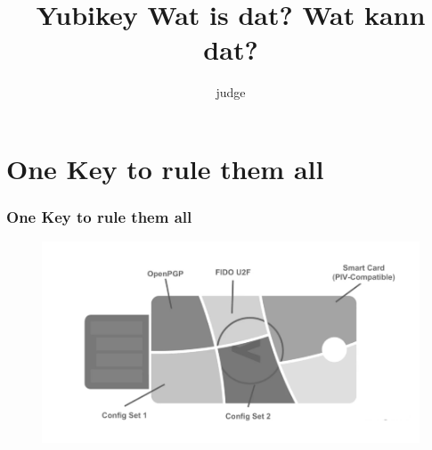\documentclass{beamer}
\title{Yubikey Wat is dat? Wat kann dat?}
\author{judge}
\date{}
\begin{document}
 
\frame{\titlepage}

\section{One Key to rule them all}
\begin{frame}
\frametitle{One Key to rule them all}
	\begin{figure}[h]
		\center
		\includegraphics[width=1\textwidth]{images/functionality.png}
	\end{figure}
\end{frame}
\end{document}
